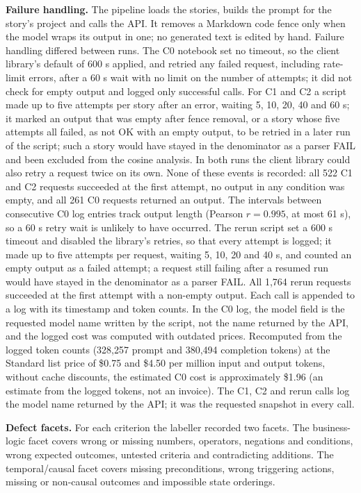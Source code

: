 \textbf{Failure handling.} The pipeline loads the stories, builds the prompt for the story's project and calls the API. It removes a Markdown code fence only when the model wraps its output in one; no generated text is edited by hand. Failure handling differed between runs. The C0 notebook set no timeout, so the client library's default of 600 s applied, and retried any failed request, including rate-limit errors, after a 60 s wait with no limit on the number of attempts; it did not check for empty output and logged only successful calls. For C1 and C2 a script made up to five attempts per story after an error, waiting 5, 10, 20, 40 and 60 s; it marked an output that was empty after fence removal, or a story whose five attempts all failed, as not OK with an empty output, to be retried in a later run of the script; such a story would have stayed in the denominator as a parser FAIL and been excluded from the cosine analysis. In both runs the client library could also retry a request twice on its own. None of these events is recorded: all 522 C1 and C2 requests succeeded at the first attempt, no output in any condition was empty, and all 261 C0 requests returned an output. The intervals between consecutive C0 log entries track output length (Pearson $r = 0.995$, at most 61 s), so a 60 s retry wait is unlikely to have occurred. The rerun script set a 600 s timeout and disabled the library's retries, so that every attempt is logged; it made up to five attempts per request, waiting 5, 10, 20 and 40 s, and counted an empty output as a failed attempt; a request still failing after a resumed run would have stayed in the denominator as a parser FAIL. All 1,764 rerun requests succeeded at the first attempt with a non-empty output. Each call is appended to a log with its timestamp and token counts. In the C0 log, the model field is the requested model name written by the script, not the name returned by the API, and the logged cost was computed with outdated prices. Recomputed from the logged token counts (328,257 prompt and 380,494 completion tokens) at the Standard list price of \$0.75 and \$4.50 per million input and output tokens, without cache discounts, the estimated C0 cost is approximately \$1.96 (an estimate from the logged tokens, not an invoice). The C1, C2 and rerun calls log the model name returned by the API; it was the requested snapshot in every call.

\textbf{Defect facets.} For each criterion the labeller recorded two facets. The business-logic facet covers wrong or missing numbers, operators, negations and conditions, wrong expected outcomes, untested criteria and contradicting additions. The temporal/causal facet covers missing preconditions, wrong triggering actions, missing or non-causal outcomes and impossible state orderings.

